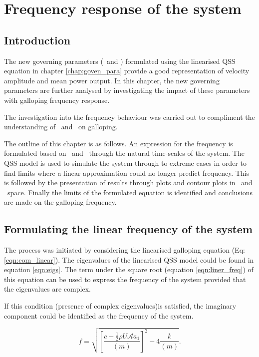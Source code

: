 \chapter{Frequency response of the system}

\section{Introduction}

The new governing parameters (\massstiff\ and \massdamp) formulated using the linearised QSS equation in chapter \ref{chap:goven_para} provide a good representation of velocity amplitude and mean power output. In this chapter, the new governing parameters are further analysed by investigating the impact of these parameters with galloping frequency response. 

The investigation into the frequency behaviour was carried out to compliment the understanding of \massstiff\ and \massdamp\ on galloping. 

The outline of this chapter is as follows. An expression for the frequency is formulated based on \massstiff\ and \massdamp\ through the natural time-scales of the system. The QSS model is used to simulate the system through to  extreme cases in order to find limits where a linear approximation could no longer predict frequency. This is followed by the presentation of results through plots and contour plots in \massstiff\ and \massdamp\ space. Finally the limits of the formulated equation is identified and conclusions are made on the galloping frequency. 


\vspace{15mm}

\section{Formulating the linear frequency of the system}

The process was initiated by considering the linearised galloping equation (Eq:\ref{eqn:eom_linear}). The eigenvalues of the linearised QSS model could be found in equation \ref{eqn:eigs}. The term under the square root (equation \ref{eqn:liner_freq}) of this equation can be used to express the frequency of the system provided that the eigenvalues are complex. 

If this condition (presence of complex eigenvalues)is satisfied, the imaginary component could be identified as the frequency of the system. 

\begin{equation}
\label{eqn:liner_freq}
f = \sqrt{\left[\frac{c-\frac{1}{2}\rho U\mathcal{A}a_1}{(m)}\right]^2-4\frac{k}{(m)}}.
\end{equation}



